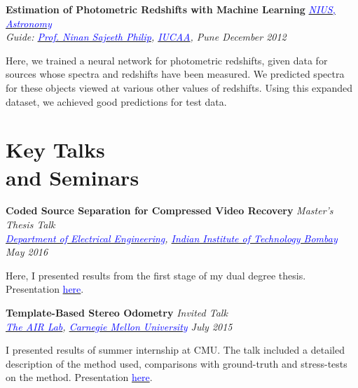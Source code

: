 \documentclass[margin,line]{res}
\newenvironment{list1}{
  \begin{list}{\ding{113}}{%
      \setlength{\itemsep}{0in}
      \setlength{\parsep}{0in} \setlength{\parskip}{0in}
      \setlength{\topsep}{0in} \setlength{\partopsep}{0in} 
      \setlength{\leftmargin}{0.17in}}}{\end{list}}
\begin{document}
\begin{resume}
{\bf Estimation of Photometric Redshifts with Machine Learning} \hfill \textit{\href{http://nius.hbcse.tifr.res.in/}{\textcolor{blue} {NIUS, Astronomy}}} \\
{\em Guide: \href{http://www.iucaa.ernet.in/~nspp/}{\textcolor{blue}{Prof. Ninan Sajeeth Philip}}, \href{http://www.iucaa.ernet.in/}{\textcolor{blue} {IUCAA}}, Pune \hfill December 2012} \\
\vspace*{-.15in}
\begin{list1}
\item[] Here, we trained a neural network for photometric redshifts, given data for sources whose spectra and redshifts have been measured. We predicted spectra for these objects viewed at various other values of redshifts. Using this expanded dataset, we achieved good predictions for test data.
\end{list1}

\section{\sc Key Talks \\ and Seminars}
{\bf Coded Source Separation for Compressed Video Recovery} \hfill {\em Master's Thesis Talk} \\
{\em \href{http://www.ee.iitb.ac.in/}{\textcolor{blue}{Department of Electrical Engineering}}, \href{http://www.iitb.ac.in/}{\textcolor{blue}{Indian Institute of Technology Bombay}} \hfill May 2016} \\
\vspace*{-.15in}
\begin{list1}
\item[] Here, I presented results from the first stage of my dual degree thesis. Presentation \href{http://alankarkotwal.github.io/sre.pptx}{\textcolor{blue} {here}}.
\end{list1}

\vspace*{-0.1in}

{\bf Template-Based Stereo Odometry} \hfill {\em Invited Talk} \\
{\em \href{http://theairlab.org/}{\textcolor{blue}{The AIR Lab}}, \href{http://www.cmu.edu/}{\textcolor{blue}{Carnegie Mellon University}} \hfill July 2015} \\
\vspace*{-.15in}
\begin{list1}
\item[] I presented results of summer internship at CMU. The talk included a detailed description of the method used, comparisons with ground-truth and stress-tests on the method. Presentation \href{http://alankarkotwal.github.io/intern_presentation.pptx}{\textcolor{blue} {here}}.
\end{list1}


\end{resume}
\end{document}
